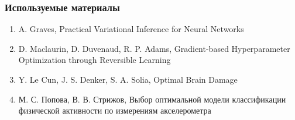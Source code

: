 \documentclass[10pt,pdf,utf8,russian,aspectratio=169]{beamer}
\begin{document}
\begin{frame}
\frametitle{Используемые материалы}
\begin{enumerate}
\item A. Graves, Practical Variational Inference for Neural Networks
\item D. Maclaurin, D. Duvenaud, R. P. Adams, Gradient-based Hyperparameter Optimization through Reversible Learning
\item Y. Le Cun, J. S. Denker, S. A. Solia, Optimal Brain Damage 
\item М. С. Попова, В. В. Стрижов, Выбор оптимальной модели классификации физической активности по измерениям акселерометра
\end{enumerate}
\end{frame}

\fi
\end{document}
